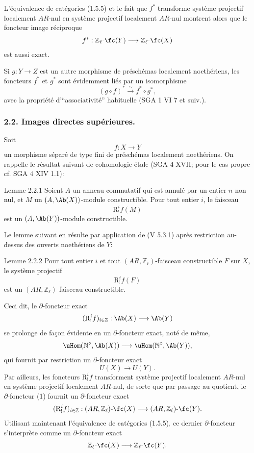 L'équivalence de catégories (1.5.5) et le fait que \(f^*\) transforme système projectif localement \(AR\)-nul en système projectif localement \(AR\)-nul montrent alors que le foncteur image réciproque
\[
f^*:\mathbb{Z}_\ell\text{-}\fc(Y)\longrightarrow \mathbb{Z}_\ell\text{-}\fc(X)
\]
est aussi exact.

Si \(g:Y\to Z\) est un autre morphisme de préschémas localement noethériens, les foncteurs \(f^*\) et \(g^*\) sont évidemment liés par un isomorphisme
\[
(g\circ f)^*\xrightarrow{\sim}f^*\circ g^*,
\]
avec la propriété d'``associativité'' habituelle (SGA 1 VI 7 et suiv.).

\subsubsection*{2.2. Images directes supérieures.}

Soit
\[
f:X\longrightarrow Y
\]
un morphisme séparé de type fini de préschémas localement noethériens. On rappelle le résultat suivant de cohomologie étale (SGA 4 XVII; pour le cas propre cf. SGA 4 XIV 1.1):

\begin{statement}{Lemme 2.2.1}
Soient \(A\) un anneau commutatif qui est annulé par un entier \(n\) non nul, et \(M\) un \((A,\Ab(X))\)-module constructible. Pour tout entier \(i\), le faisceau
\[
\mathrm{R}^i_!f(M)
\]
est un \((A,\Ab(Y))\)-module constructible.
\end{statement}

Le lemme suivant en résulte par application de (V 5.3.1) après restriction au-dessus des ouverts noethériens de \(Y\):

\begin{statement}{Lemme 2.2.2}
Pour tout entier \(i\) et tout \((AR,\mathbb{Z}_\ell)\)-faisceau constructible \(F\) sur \(X\), le système projectif
\[
\mathrm{R}^i_!f(F)
\]
est un \((AR,\mathbb{Z}_\ell)\)-faisceau constructible.
\end{statement}

Ceci dit, le \(\partial\)-foncteur exact
\[
(\mathrm{R}^i_!f)_{i\in\mathbb{Z}}:\Ab(X)\longrightarrow \Ab(Y)
\]
se prolonge de façon évidente en un \(\partial\)-foncteur exact, noté de même,
\[
\uHom(\mathbb{N}^\circ,\Ab(X))\longrightarrow \uHom(\mathbb{N}^\circ,\Ab(Y)),
\]
qui fournit par restriction un \(\partial\)-foncteur exact
\[
U(X)\longrightarrow U(Y).
\tag{1}
\]
Par ailleurs, les foncteurs \(\mathrm{R}^i_!f\) transforment système projectif localement \(AR\)-nul en système projectif localement \(AR\)-nul, de sorte que par passage au
quotient, le \(\partial\)-foncteur (1) fournit un \(\partial\)-foncteur exact\[
(\mathrm{R}^i_!f)_{i\in\mathbb{Z}}:(AR,\mathbb{Z}_\ell)\text{-}\fc(X)
\longrightarrow (AR,\mathbb{Z}_\ell)\text{-}\fc(Y).
\]
Utilisant maintenant l'équivalence de catégories (1.5.5), ce dernier \(\partial\)-foncteur s'interprète comme un \(\partial\)-foncteur exact
\[
\mathbb{Z}_\ell\text{-}\fc(X)\longrightarrow \mathbb{Z}_\ell\text{-}\fc(Y).
\]

